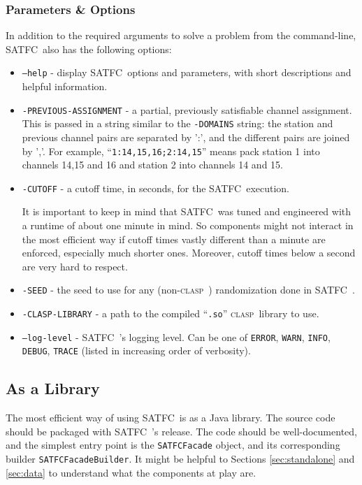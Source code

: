 \documentclass[
10pt, %
a4paper, %
oneside, %
headinclude,footinclude, %
BCOR5mm, %
]{scrartcl}
\newcommand{\SATFC}{\textsc{SATFC}~}
\newcommand{\clasp}{\textsc{clasp}~}
\begin{document}
\subsubsection{Parameters \& Options}
In addition to the required arguments to solve a problem from the command-line, \SATFC also has the following options:
\begin{itemize}
\item \texttt{---help} - display \SATFC options and parameters, with short descriptions and helpful information.
\item \texttt{-PREVIOUS-ASSIGNMENT} - a partial, previously satisfiable channel assignment. This is passed in a string similar to the \texttt{-DOMAINS} string: the station and previous channel pairs are separated by ':', and the different pairs are joined by ','. For example, ``\texttt{1:14,15,16;2:14,15}'' means pack station 1 into channels 14,15 and 16 and station 2 into channels 14 and 15.
\item \texttt{-CUTOFF} - a cutoff time, in seconds, for the \SATFC execution. 
\begin{fwarning}
It is important to keep in mind that \SATFC was tuned and engineered with a runtime of about one minute in mind. So components might not interact in the most efficient way if cutoff times vastly different than a minute are enforced, especially much shorter ones. Moreover, cutoff times below a second are very hard to respect.
\end{fwarning}
\item \texttt{-SEED} - the seed to use for any (non-\clasp) randomization done in \SATFC.
\item \texttt{-CLASP-LIBRARY} - a path to the compiled ``\texttt{.so}'' \clasp library to use.
\item \texttt{---log-level} - \SATFC's logging level. Can be one of \texttt{ERROR}, \texttt{WARN}, \texttt{INFO}, \texttt{DEBUG}, \texttt{TRACE} (listed in increasing order of verbosity).
\end{itemize}

\subsection{As a Library}

The most efficient way of using \SATFC is as a Java library. The source code should be packaged with \SATFC's release. The code should be well-documented, and the simplest entry point is the \texttt{SATFCFacade} object, and its corresponding builder \texttt{SATFCFacadeBuilder}. It might be helpful to Sections \ref{sec:standalone} and \ref{sec:data} to understand what the components at play are.
\end{document}
